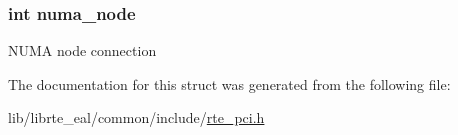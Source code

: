 \subsubsection[{numa\+\_\+node}]{\setlength{\rightskip}{0pt plus 5cm}int numa\+\_\+node}\label{structrte__pci__device_ad090419c0eee32bef787f0b111ee679c}
N\+U\+M\+A node connection 

The documentation for this struct was generated from the following file\+:\begin{DoxyCompactItemize}
\item 
lib/librte\+\_\+eal/common/include/\hyperlink{rte__pci_8h}{rte\+\_\+pci.\+h}\end{DoxyCompactItemize}
